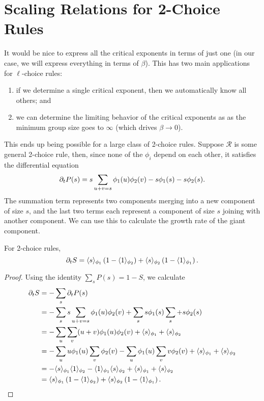 \documentclass[twoside,10pt]{article}
\begin{document}
\section{Scaling Relations for 2-Choice Rules}

It would be nice to express all the critical exponents in terms of just one (in our case, we will express everything in terms of $\beta$). This has two main applications for $\ell$-choice rules:
\begin{enumerate}
	\item if we determine a single critical exponent, then we automatically know all others; and
	\item we can determine the limiting behavior of the critical exponents as as the minimum group size goes to $\infty$ (which drives $\beta\to 0$).
\end{enumerate}

This ends up being possible for a large class of 2-choice rules. Suppose $\mathcal{R}$ is some general 2-choice rule, then, since none of the $\phi_i$ depend on each other, it satisfies the differential equation
	\[
		\partial_{t}{P(s)} = s \sum_{u+v=s} \phi_1(u) \phi_2(v) - s \phi_1(s) - s\phi_2(s).
	\]
The summation term represents two components merging into a new component of size $s$, and the last two terms each represent a component of size $s$ joining with another component. We can use this to calculate the growth rate of the giant component.
\begin{prop}
	\label{2c-sdelS}
	For 2-choice rules,
	\[
		\partial_{t}{S} = \langle s \rangle_{\phi_1}\left( 1-\langle 1 \rangle_{\phi_2} \right) + \langle s \rangle_{\phi_2}\left( 1-\langle 1 \rangle_{\phi_1} \right).
	\]
\end{prop}
\begin{proof}
	Using the identity $\sum_s P(s) = 1-S$, we calculate
	\begin{align*}
		\partial_{t}{S} &= - \sum_s \partial_{t}{P(s)} \\
			  &= - \sum_s s \sum_{u+v=s}\phi_1(u)\phi_2(v) + \sum_s s \phi_1(s) \sum_s + s \phi_2(s) \\
			  &= - \sum_u \sum_v (u+v) \phi_1(u)\phi_2(v) + \langle s \rangle_{\phi_1} + \langle s \rangle_{\phi_2} \\
			  &= -\sum_{u}u \phi_1(u) \sum_{v} \phi_2(v) - \sum_{u}\phi_1(u)\sum_{v}v \phi_2(v) + \langle s \rangle_{\phi_1} + \langle s \rangle_{\phi_2} \\
			  &= -\langle s \rangle_{\phi_1}\langle 1 \rangle_{\phi_2} - \langle 1 \rangle_{\phi_1}\langle s \rangle_{\phi_2} + \langle s \rangle_{\phi_1}+\langle s \rangle_{\phi_2} \\
			  &= \langle s \rangle_{\phi_1}\left( 1-\langle 1 \rangle_{\phi_2} \right) + \langle s \rangle_{\phi_2}\left( 1-\langle 1 \rangle_{\phi_1} \right).
	\end{align*}
\end{proof}
\end{document}
